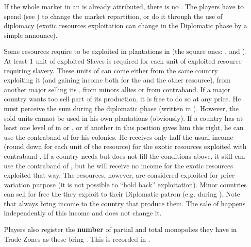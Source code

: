\bparag If the whole market in an \Area is already attributed, there is
no . The players have to spend
 (see )
to change the market repartition, or do it through the use of diplomacy
(exotic resources exploitation can change in the Diplomatic phase by a
simple announce).

\label{chIncomes:NeedSlaves}
Some resources require  to be exploited in plantations in
 (the square ones: ,  and ). At least 1 unit of exploited Slaves is
required for each unit of exploited resource requiring slavery.
 These units of  can come either
from the same country exploiting it (and gaining income both for the
 and the other resource), from another major selling its
, from minors allies or from contraband.
 If a major country wants too sell part of
its  production, it is free to do so at any price. He must
perceive the sum during the diplomatic phase (written in
). However, the sold  units
cannot be used in his own plantations (obviously).
 If a country has at least one level of
\TradeFLEET in  or , or if another \MAJ in this
position gives him this right, he can use the contraband of
 for his colonies. He receives only half the usual income
(round down for each unit of the resource) for the exotic resources
exploited with contraband .
 If a country needs  but
does not fill the conditions above, it still can use the contraband of
, but he will receive no income for the exotic resources
exploited that way. The resources, however, are considered exploited for
price variation purpose (it is not possible to ``hold back''
exploitation).
 Minor countries can sell for free the
 they exploit to their Diplomatic patron
(e.g.  during ).
\bparag Note that  always bring income to the country that
produce them. The sale of  happens independently of this
income and does not change it.

\aparag Players also register the \textbf{number} of partial and total
monopolies they have in Trade Zones as these bring \VPs. This is
recorded in .

